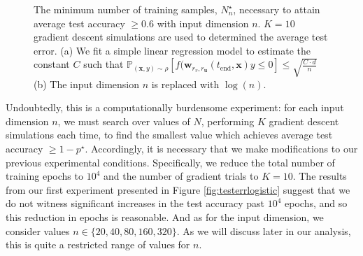 \documentclass{article}
\begin{document}
\begin{figure}[H]
\centering
{}\hfill
{}
\caption{The minimum number of training samples, $N_n^{\star}$, necessary to attain average test accuracy $\geq 0.6$ with input dimension $n$. $K=10$ gradient descent simulations are used to determined the average test error. (a) We fit a simple linear regression model to estimate the constant $C$ such that $\mathbb{P}_{(\boldsymbol{x}, y) \sim \rho}[f(\boldsymbol{w}_{r_v, r_{\boldsymbol{u}}}(t_{\text{end}}, \boldsymbol{x})y \leq 0] \leq \sqrt{\frac{C \cdot d}{n}}$ (b) The input dimension $n$ is replaced with $\log(n)$.}\label{fig:numsamples}
\end{figure}

Undoubtedly, this is a computationally burdensome experiment: for each input dimension $n$, we must search over values of $N$, performing $K$ gradient descent simulations each time, to find the smallest value which achieves average test accuracy $\geq 1-p^{\star}$. Accordingly, it is necessary that we make modifications to our previous experimental conditions. Specifically, we reduce the total number of training epochs to $10^4$ and the number of gradient trials to $K = 10$. The results from our first experiment presented in Figure \ref{fig:testerrlogistic} suggest that we do not witness significant increases in the test accuracy past $10^4$ epochs, and so this reduction in epochs is reasonable. And as for the input dimension, we consider values $n \in \{20, 40, 80, 160, 320\}$. As we will discuss later in our analysis, this is quite a restricted range of values for $n$.
\end{document}
